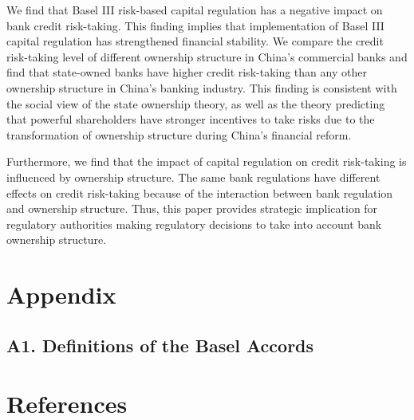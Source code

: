 \documentclass{article}
\begin{document}
We find that Basel III risk-based capital regulation has a negative
impact on bank credit risk-taking. This finding implies that
implementation of Basel III capital regulation has strengthened
financial stability. We compare the credit risk-taking level of
different ownership structure in China's commercial banks and find that
state-owned banks have higher credit risk-taking than any other
ownership structure in China's banking industry. This finding is
consistent with the social view of the state ownership theory, as well
as the theory predicting that powerful shareholders have stronger
incentives to take risks due to the transformation of ownership
structure during China's financial reform.

Furthermore, we find that the impact of capital regulation on credit
risk-taking is influenced by ownership structure. The same bank
regulations have different effects on credit risk-taking because of the
interaction between bank regulation and ownership structure. Thus, this
paper provides strategic implication for regulatory authorities making
regulatory decisions to take into account bank ownership structure.

\hypertarget{appendix}{%
\section{Appendix}\label{appendix}}

\hypertarget{a1.-definitions-of-the-basel-accords}{%
\subsection{A1. Definitions of the Basel
Accords}\label{a1.-definitions-of-the-basel-accords}}

\hypertarget{references}{%
\section*{References}\label{references}}
\end{document}
